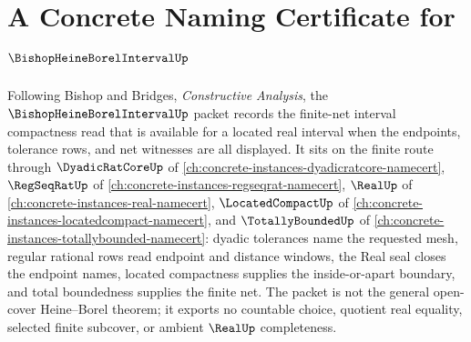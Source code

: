 \chapter{A Concrete Naming Certificate for $\BishopHeineBorelIntervalUp$}
\label{ch:concrete-instances-bishop-heine-borel-interval-namecert}

Following Bishop and Bridges, \emph{Constructive Analysis}, the $\BishopHeineBorelIntervalUp$ packet records the finite-net interval compactness read that is available for a located real interval when the endpoints, tolerance rows, and net witnesses are all displayed. It sits on the finite route through $\DyadicRatCoreUp$ of \autoref{ch:concrete-instances-dyadicratcore-namecert}, $\RegSeqRatUp$ of \autoref{ch:concrete-instances-regseqrat-namecert}, $\RealUp$ of \autoref{ch:concrete-instances-real-namecert}, $\LocatedCompactUp$ of \autoref{ch:concrete-instances-locatedcompact-namecert}, and $\TotallyBoundedUp$ of \autoref{ch:concrete-instances-totallybounded-namecert}: dyadic tolerances name the requested mesh, regular rational rows read endpoint and distance windows, the Real seal closes the endpoint names, located compactness supplies the inside-or-apart boundary, and total boundedness supplies the finite net. The packet is not the general open-cover Heine--Borel theorem; it exports no countable choice, quotient real equality, selected finite subcover, or ambient $\RealUp$ completeness.

